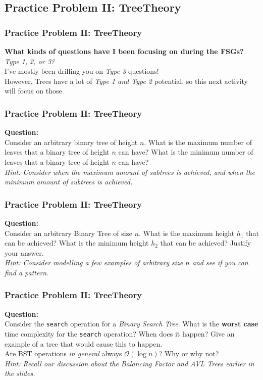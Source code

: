 \documentclass[hyperref={colorlinks,citecolor=blue,linkcolor=blue,urlcolor=blue}, aspectratio=1610]{beamer}
\begin{document}
\subsection{Practice Problem II: TreeTheory}
\begin{frame}
  \frametitle{Practice Problem II: TreeTheory}
  
  \textbf{What kinds of questions have I been focusing on during the FSGs?} \\
  \textit{Type 1, 2, or 3?} \\
  I've mostly been drilling you on \textit{Type 3} questions! \\
  However, Trees have a lot of \textit{Type 1 and Type 2} potential, so this next activity will focus on those.\\
\end{frame}

\begin{frame}
  \frametitle{Practice Problem II: TreeTheory}
  \textbf{Question:} \\
  Consider an arbitrary binary tree of height $n$. What is the maximum number of leaves that a binary tree of height $n$ can have? What is the minimum number of leaves that a binary tree of height $n$ can have? \\
  \textit{Hint: Consider when the maximum amount of subtrees is achieved, and when the minimum amount of subtrees is achieved.}
\end{frame}

\begin{frame}
  \frametitle{Practice Problem II: TreeTheory}
  \textbf{Question:} \\
  Consider an arbitrary Binary Tree of size $n$. What is the maximum height $h_1$ that can be achieved? What is the minimum height $h_2$ that can be achieved? Justify your answer. \\
  \textit{Hint: Consider modelling a few examples of arbitrary size $n$ and see if you can find a pattern.}
\end{frame}

\begin{frame}
  \frametitle{Practice Problem II: TreeTheory}
  \textbf{Question:} \\
  Consider the \texttt{search} operation for a \textit{Binary Search Tree}. What is the \textbf{worst case} time complexity for the \texttt{search} operation? When does it happen? Give an example of a tree that would cause this to happen. \\
  Are BST operations \textit{in general} always $\mathcal{O}(\log n)$? Why or why not? \\
  \textit{Hint: Recall our discussion about the \textit{Balancing Factor} and \textit{AVL Trees} earlier in the slides.}
\end{frame}
\end{document}
